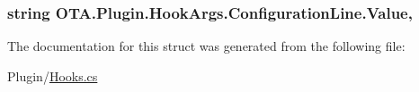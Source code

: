 \subsubsection[{Value}]{\setlength{\rightskip}{0pt plus 5cm}string O\+T\+A.\+Plugin.\+Hook\+Args.\+Configuration\+Line.\+Value\hspace{0.3cm}{\ttfamily [get]}, {\ttfamily [set]}}\label{struct_o_t_a_1_1_plugin_1_1_hook_args_1_1_configuration_line_a916ffb49d740399dbd024b7f80c41012}


The documentation for this struct was generated from the following file\+:\begin{DoxyCompactItemize}
\item 
Plugin/\hyperlink{_hooks_8cs}{Hooks.\+cs}\end{DoxyCompactItemize}
